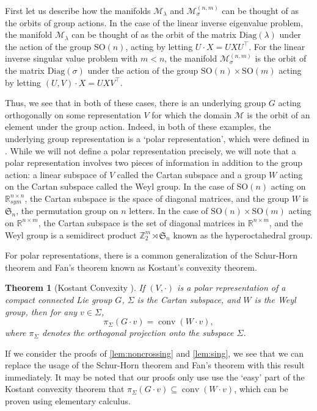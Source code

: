 \documentclass{article}
\numberwithin{equation}{section}
\newcommand{\R}{\mathbb{R}}
\newcommand{\Z}{\mathbb{Z}}
\newcommand{\SO}{\text{SO}}
\DeclareMathOperator*{\conv}{conv}
\newcommand{\Diag}{\text{Diag}}
\newtheorem{theorem}{Theorem}[section]
\newcommand{\cM}{{\mathcal{M}}}
\begin{document}
First let us describe how the manifolds $\cM_{\lambda}$ and $\cM_{\sigma}^{(n,m)}$ can be thought of as the orbits of group actions.
In the case of the 
linear inverse eigenvalue problem, the manifold $\cM_{\lambda}$ can be thought of as the orbit of the matrix $\Diag(\lambda)$ under the action of the group $\SO(n)$, acting by letting $U \cdot X = UXU^{\intercal}$.
For the linear inverse singular value problem with $m < n$, the manifold $\cM^{(n,m)}_{\sigma}$ is the orbit of the matrix $\Diag(\sigma)$ under the action of the group $\SO(n) \times \SO(m)$ acting by letting $(U, V) \cdot X = UXV^{\intercal}$.

Thus, we see that in both of these cases, there is an underlying group $G$ acting orthogonally on some representation $V$ for which the domain $\cM$ is the orbit of an element under the group action. Indeed, in both of these examples, the underlying group representation is a `polar representation', which were defined in \cite{dadok1985polar}. While we will not define a polar representation precisely, we will note that a polar representation involves two pieces of information in addition to the group action: a linear subspace of $V$ called the Cartan subspace and a group $W$ acting on the Cartan subspace called the Weyl group. In the case of $\SO(n)$ acting on $\R^{n\times n}_{sym}$, the Cartan subspace is the space of diagonal matrices, and the group $W$ is $\mathfrak{S}_n$, the permutation group on $n$ letters. In the case of $\SO(n) \times \SO(m)$ acting on $\R^{n\times m}$, the Cartan subspace is the set of diagonal matrices in $\R^{n \times m}$, and the Weyl group is a semidirect product $\Z_2^{m} \rtimes \mathfrak{S}_n$ known as the hyperoctahedral group.

For polar representations, there is a common generalization of the Schur-Horn theorem and Fan's theorem known as Kostant's convexity theorem.
\begin{theorem}[Kostant Convexity \cite{kostant1973convexity}]
If $(V,\cdot)$ is a polar representation of a compact connected Lie group $G$, $\Sigma$ is the Cartan subspace, and $W$ is the Weyl group, then for any $v\in \Sigma$,
\[
    \pi_{\Sigma}(G \cdot v) = \conv(W\cdot v),
\]
where $\pi_{\Sigma}$ denotes the orthogonal projection onto the subspace $\Sigma$.
\end{theorem}
If we consider the proofs of \cref{lem:noncrossing} and \cref{lem:sing}, we see that we can replace the usage of the Schur-Horn theorem and Fan's theorem with this result immediately.
It may be noted that our proofs only use use the `easy' part of the Kostant convexity theorem that $\pi_{\Sigma}(G \cdot v) \subseteq \conv(W\cdot v)$, which can be proven using elementary calculus.
\end{document}
